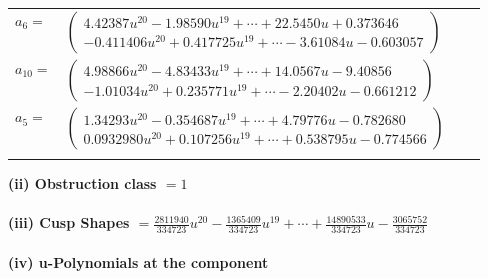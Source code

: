 \documentclass[1p]{elsarticle_modified}
\theoremstyle{definition}
\begin{document}
\begin{tabular}{m{7pt} m{180pt} m{7pt} m{180pt} }
\flushright $a_{6}=$&$\begin{pmatrix}4.42387 u^{20}-1.98590 u^{19}+\cdots+22.5450 u+0.373646\\-0.411406 u^{20}+0.417725 u^{19}+\cdots-3.61084 u-0.603057\end{pmatrix}$ \\
\flushright $a_{10}=$&$\begin{pmatrix}4.98866 u^{20}-4.83433 u^{19}+\cdots+14.0567 u-9.40856\\-1.01034 u^{20}+0.235771 u^{19}+\cdots-2.20402 u-0.661212\end{pmatrix}$ \\
\flushright $a_{5}=$&$\begin{pmatrix}1.34293 u^{20}-0.354687 u^{19}+\cdots+4.79776 u-0.782680\\0.0932980 u^{20}+0.107256 u^{19}+\cdots+0.538795 u-0.774566\end{pmatrix}$\\&\end{tabular}
\flushleft \textbf{(ii) Obstruction class $= 1$}\\~\\
\flushleft \textbf{(iii) Cusp Shapes $= \frac{2811940}{334723} u^{20}-\frac{1365409}{334723} u^{19}+\cdots+\frac{14890533}{334723} u-\frac{3065752}{334723}$}\\~\\
\newpage\renewcommand{\arraystretch}{1}
\flushleft \textbf{(iv) u-Polynomials at the component}\newline \\
\end{document}

